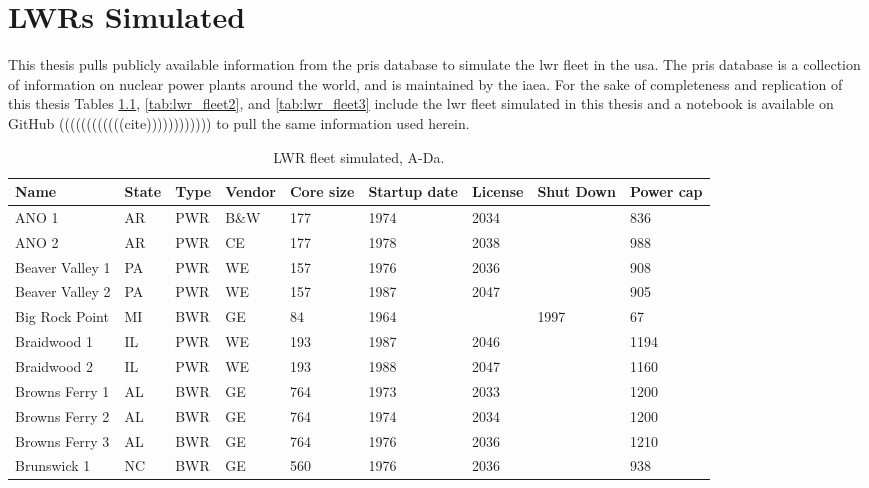 \chapter{LWRs Simulated}
\label{app:lwrs}

This thesis pulls publicly available information from the \gls{pris} database to simulate the \gls{lwr} fleet in the \gls{usa}. The \gls{pris} database is a collection of information on nuclear power plants around the world, and is maintained by the \gls{iaea}. For the sake of completeness and replication of this thesis Tables \ref{tab:lwr_fleet_1}, \ref{tab:lwr_fleet2}, and \ref{tab:lwr_fleet3} include the \gls{lwr} fleet simulated in this thesis and a notebook is available on GitHub ((((((((((((cite)))))))))))) to pull the same information used herein.


\begin{table}[H]
    \centering
    \caption{LWR fleet simulated, A-Da.}
    \label{tab:lwr_fleet_1}
    \begin{tabular}{l l l l l l l l l}
    \hline
    \textbf{Name} & \textbf{State} & \textbf{Type} & \textbf{Vendor} & \textbf{Core size} & \textbf{Startup date} & \textbf{License} & \textbf{Shut Down} & \textbf{Power cap} \\
    \hline
    ANO 1                 &AR & PWR & B\&W & 177 & 1974 & 2034 &      & 836 \\
    ANO 2                 &AR & PWR & CE   & 177 & 1978 & 2038 &      & 988 \\
    Beaver Valley 1       &PA & PWR & WE   & 157 & 1976 & 2036 &      & 908 \\
    Beaver Valley 2       &PA & PWR & WE   & 157 & 1987 & 2047 &      & 905 \\
    Big Rock Point        &MI & BWR & GE   & 84  & 1964 &      & 1997 & 67  \\
    Braidwood 1           &IL & PWR & WE   & 193 & 1987 & 2046 &      & 1194\\
    Braidwood 2           &IL & PWR & WE   & 193 & 1988 & 2047 &      & 1160\\
    Browns Ferry 1        &AL & BWR & GE   & 764 & 1973 & 2033 &      & 1200\\
    Browns Ferry 2        &AL & BWR & GE   & 764 & 1974 & 2034 &      & 1200\\
    Browns Ferry 3        &AL & BWR & GE   & 764 & 1976 & 2036 &      & 1210\\
    Brunswick 1           &NC & BWR & GE   & 560 & 1976 & 2036 &      & 938 \\

\end{tabular}
\end{table}
